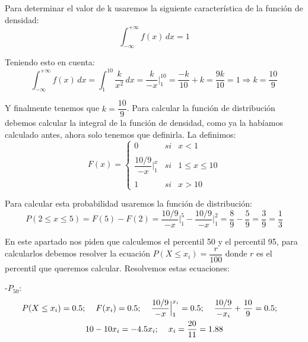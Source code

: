 \problem

\subproblem

Para determinar el valor de k usaremos la siguiente característica de la función de densidad:
\begin{equation*}
    \int_{-\infty}^{+\infty} f(x) \,dx = 1
\end{equation*}

Teniendo esto en cuenta:
\begin{equation*}
    \int_{-\infty}^{+\infty} f(x) \,dx = \int_1^{10} \dfrac{k}{x^2} \,dx = \dfrac{k}{-x} \Big|^{10}_1 = \dfrac{-k}{10} + k = \dfrac{9k}{10} = 1 \Rightarrow k = \dfrac{10}{9}
\end{equation*}

Y finalmente tenemos que $k = \dfrac{10}{9}$. Para calcular la función de distribución debemos calcular la integral de la función de densidad, como ya la habíamos calculado antes, ahora solo tenemos que definirla. La definimos:
\begin{equation*}
    F(x) = \left\{ \begin{array}{lcc}
             0 &   si  & x < 1 \\
             \\ \dfrac{10/9}{-x} \Big|^x_1 &  si & 1 \leq x \leq 10 \\
             \\ 1 &  si  & x > 10
             \end{array}
   \right.
\end{equation*}

\subproblem

Para calcular esta probabilidad usaremos la función de distribución:
\begin{equation*}
    P(2 \leq x \leq 5) = F(5) - F(2) = \dfrac{10/9}{-x} \Big|^5_1 - \dfrac{10/9}{-x} \Big|^2_1 = \dfrac{8}{9} - \dfrac{5}{9} = \dfrac{3}{9} = \dfrac{1}{3}
\end{equation*}

\subproblem

En este apartado nos piden que calculemos el percentil 50 y el percentil 95, para calcularlos debemos resolver la ecuación $P(X \leq x_i) = \dfrac{r}{100}$ donde $r$ es el percentil que queremos calcular. Resolvemos estas ecuaciones:

-$P_{50}$:
\begin{gather*}
    P(X \leq x_i) = 0.5 ; \hspace{0.4cm} F(x_i) = 0.5 ; \hspace{0.4cm} \dfrac{10/9}{-x} \Big|^{x_i}_1 = 0.5 ; \hspace{0.4cm} \dfrac{10/9}{-x_i} + \dfrac{10}{9} = 0.5 ; \hspace{0.4cm}\\ 10-10x_i = -4.5x_i ; \hspace{0.4cm} x_i = \dfrac{20}{11} = 1.88
\end{gather*}


